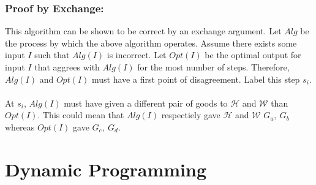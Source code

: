 \documentclass[12pt]{article}
\begin{document}
\subsubsection*{Proof by Exchange:}
This algorithm can be shown to be correct by an exchange argument.
Let $Alg$ be the process by which the above algorithm operates.
Assume there exists some input $I$ such that $Alg(I)$ is incorrect.
Let $Opt(I)$ be the optimal output for input $I$ that aggrees with
$Alg(I)$ for the most number of steps.  Therefore, $Alg(I)$ and $Opt(I)$
must have a first point of disagreement.  Label this step $s_i$.\\\\
At $s_i$, $Alg(I)$ must have given a different pair of goods to
$\mathcal{H}$ and $\mathcal{W}$ than $Opt(I)$.  This could mean that
$Alg(I)$ respectiely gave $\mathcal{H}$ and $\mathcal{W}$ $G_a,\ G_b$      
whereas $Opt(I)$ gave $G_c,\ G_d$.
\section*{Dynamic Programming}
\end{document}
